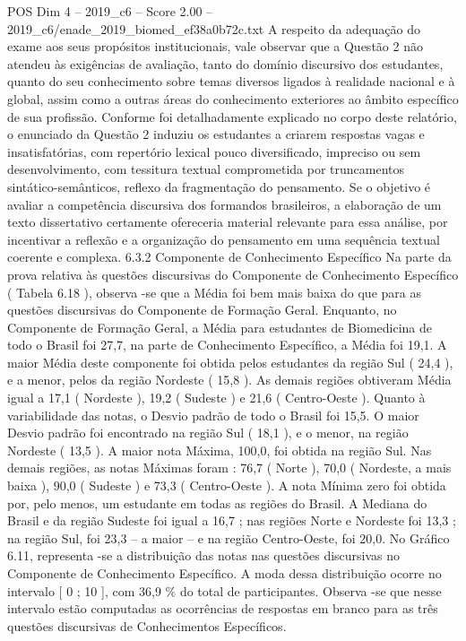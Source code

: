 \begin{textsample}{POS Dim 4 – 2019\_c6 – Score 2.00 – 2019\_c6/enade\_2019\_biomed\_ef38a0b72c.txt}
A respeito da adequação do exame aos seus propósitos institucionais, vale observar que a Questão 2 não atendeu às exigências de avaliação, tanto do domínio discursivo dos estudantes, quanto do seu conhecimento sobre temas diversos ligados à realidade nacional e à global, assim como a outras áreas do conhecimento exteriores ao âmbito específico de sua profissão.
Conforme foi detalhadamente explicado no corpo deste relatório, o enunciado da Questão 2 induziu os estudantes a criarem respostas vagas e insatisfatórias, com repertório lexical pouco diversificado, impreciso ou sem desenvolvimento, com tessitura textual comprometida por truncamentos sintático-semânticos, reflexo da fragmentação do pensamento.
Se o objetivo é avaliar a competência discursiva dos formandos brasileiros, a elaboração de um texto dissertativo certamente ofereceria material relevante para essa análise, por incentivar a reflexão e a organização do pensamento em uma sequência textual coerente e complexa. 6.3.2 Componente de Conhecimento Específico Na parte da prova relativa às questões discursivas do Componente de Conhecimento Específico ( Tabela 6.18 ), observa -se que a Média foi bem mais baixa do que para as questões discursivas do Componente de Formação Geral.
Enquanto, no Componente de Formação Geral, a Média para estudantes de Biomedicina de todo o Brasil foi 27,7, na parte de Conhecimento Específico, a Média foi 19,1.
A maior Média deste componente foi obtida pelos estudantes da região Sul ( 24,4 ), e a menor, pelos da região Nordeste ( 15,8 ).
As demais regiões obtiveram Média igual a 17,1 ( Nordeste ), 19,2 ( Sudeste ) e 21,6 ( Centro-Oeste ).
Quanto à variabilidade das notas, o Desvio padrão de todo o Brasil foi 15,5.
O maior Desvio padrão foi encontrado na região Sul ( 18,1 ), e o menor, na região Nordeste ( 13,5 ).
A maior nota Máxima, 100,0, foi obtida na região Sul.
Nas demais regiões, as notas Máximas foram : 76,7 ( Norte ), 70,0 ( Nordeste, a mais baixa ), 90,0 ( Sudeste ) e 73,3 ( Centro-Oeste ).
A nota Mínima zero foi obtida por, pelo menos, um estudante em todas as regiões do Brasil.
A Mediana do Brasil e da região Sudeste foi igual a 16,7 ; nas regiões Norte e Nordeste foi 13,3 ; na região Sul, foi 23,3 – a maior – e na região Centro-Oeste, foi 20,0.
No Gráfico 6.11, representa -se a distribuição das notas nas questões discursivas no Componente de Conhecimento Específico.
A moda dessa distribuição ocorre no intervalo [ 0 ; 10 ], com 36,9 \% do total de participantes.
Observa -se que nesse intervalo estão computadas as ocorrências de respostas em branco para as três questões discursivas de Conhecimentos Específicos.

\end{textsample}
